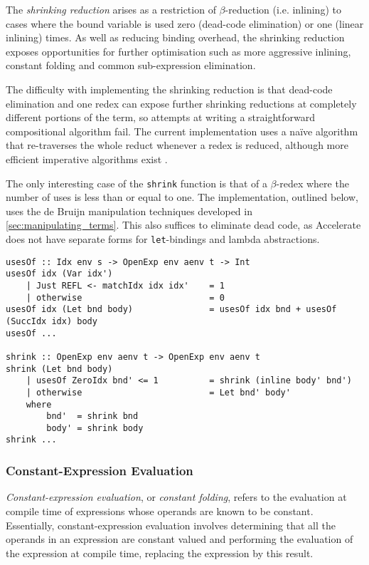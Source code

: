 The \emph{shrinking reduction} arises as a restriction of $\beta$-reduction
(i.e. inlining) to cases where the bound variable is used zero (dead-code
elimination) or one (linear inlining) times. As well as reducing binding
overhead, the shrinking reduction exposes opportunities for further optimisation
such as more aggressive inlining, constant folding and common sub-expression
elimination.

The difficulty with implementing the shrinking reduction is that dead-code
elimination and one redex can expose further shrinking reductions at completely
different portions of the term, so attempts at writing a straightforward
compositional algorithm fail. The current implementation uses a na\"ive
algorithm that re-traverses the whole reduct whenever a redex is reduced,
although more efficient imperative algorithms exist
\cite{Appel:1997gs,Benton:2004ua,Kennedy:2007cb}.

The only interesting case of the \texttt{shrink} function is that of a
$\beta$-redex where the number of uses is less than or equal to one. The
implementation, outlined below, uses the de Bruijn manipulation techniques
developed in \autoref{sec:manipulating_terms}. This also suffices to eliminate
dead code, as Accelerate does not have separate forms for \texttt{let}-bindings
and lambda abstractions.
%
\begin{lstlisting}[style=Haskell,caption={The shrinking reduction}]
usesOf :: Idx env s -> OpenExp env aenv t -> Int
usesOf idx (Var idx')
    | Just REFL <- matchIdx idx idx'    = 1
    | otherwise                         = 0
usesOf idx (Let bnd body)               = usesOf idx bnd + usesOf (SuccIdx idx) body
usesOf ...

shrink :: OpenExp env aenv t -> OpenExp env aenv t
shrink (Let bnd body)
    | usesOf ZeroIdx bnd' <= 1          = shrink (inline body' bnd')
    | otherwise                         = Let bnd' body'
    where
        bnd'  = shrink bnd
        body' = shrink body
shrink ...
\end{lstlisting}


\subsubsection{Constant-Expression Evaluation}

\emph{Constant-expression evaluation}, or \emph{constant folding}, refers to the
evaluation at compile time of expressions whose operands are known to be
constant. Essentially, constant-expression evaluation involves determining that
all the operands in an expression are constant valued and performing the
evaluation of the expression at compile time, replacing the expression by this
result.

